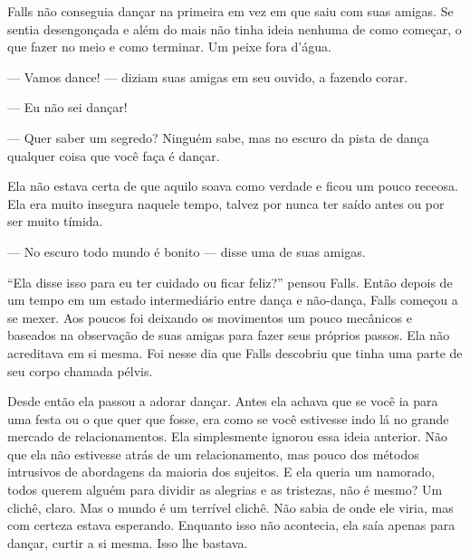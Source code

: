 Falls não conseguia dançar na primeira em vez em que saiu com suas amigas. Se sentia desengonçada e além do mais não tinha ideia nenhuma de como começar, o que fazer no meio e como terminar. Um peixe fora d'água.

--- Vamos dance! --- diziam suas amigas em seu ouvido, a fazendo corar.

--- Eu não sei dançar!

--- Quer saber um segredo? Ninguém sabe, mas no escuro da pista de dança qualquer coisa que você faça é dançar.

Ela não estava certa de que aquilo soava como verdade e ficou um pouco receosa. Ela era muito insegura naquele tempo, talvez por nunca ter saído antes ou por ser muito tímida.

--- No escuro todo mundo é bonito --- disse uma de suas amigas.

``Ela disse isso para eu ter cuidado ou ficar feliz?''\mudanca{,} pensou Falls. Então\mudanca{,} depois de um tempo em um estado intermediário entre dança e não-dança, Falls começou a se mexer. Aos poucos foi deixando os movimentos um pouco mecânicos e baseados na observação de suas amigas para fazer seus próprios passos. Ela não acreditava em si mesma. Foi nesse dia que Falls descobriu que tinha uma parte de seu corpo chamada pélvis.

Desde então ela passou a adorar dançar. Antes ela achava que se você ia para uma festa ou o que quer que fosse, era como se você estivesse indo lá  no grande mercado de relacionamentos. Ela simplesmente ignorou essa ideia anterior. Não que ela não estivesse atrás de um relacionamento, mas  pouco dos métodos intrusivos de abordagens da maioria dos sujeitos. E ela queria um namorado, todos querem alguém para dividir as alegrias e as tristezas, não é mesmo? Um clichê, claro. Mas o mundo é um terrível clichê. Não sabia de onde ele viria, mas com certeza estava esperando. Enquanto isso não acontecia, ela saía apenas para dançar, curtir a si mesma. Isso lhe bastava.

